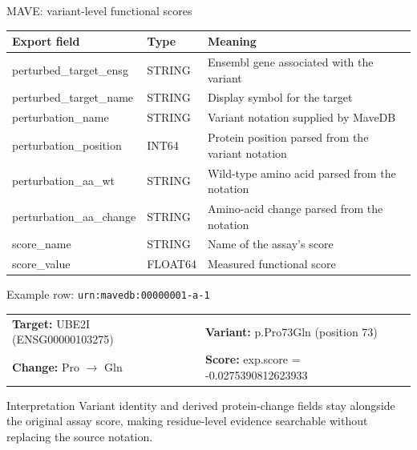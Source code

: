 \documentclass[handout,aspectratio=169]{beamer}
\begin{document}
\begin{frame}{MAVE: variant-level functional scores}
  \small
  \begin{tabularx}{\textwidth}{@{}>{\ttfamily}l l X@{}}
    \toprule
    \textbf{Export field} & \textbf{Type} & \textbf{Meaning} \\
    \midrule
    perturbed\_target\_ensg & STRING & Ensembl gene associated with the variant \\
    perturbed\_target\_name & STRING & Display symbol for the target \\
    perturbation\_name & STRING & Variant notation supplied by MaveDB \\
    perturbation\_position & INT64 & Protein position parsed from the variant notation \\
    perturbation\_aa\_wt & STRING & Wild-type amino acid parsed from the notation \\
    perturbation\_aa\_change & STRING & Amino-acid change parsed from the notation \\
    score\_name & STRING & Name of the assay's score \\
    score\_value & FLOAT64 & Measured functional score \\
    \bottomrule
  \end{tabularx}
  \vfill
  \begin{block}{Example row: \texttt{urn:mavedb:00000001-a-1}}
    \scriptsize
    \begin{tabularx}{\textwidth}{@{}X X@{}}
      \textbf{Target:} UBE2I (ENSG00000103275) & \textbf{Variant:} p.Pro73Gln (position 73) \\
      \textbf{Change:} Pro $\rightarrow$ Gln & \textbf{Score:} exp.score = -0.0275390812623933 \\
    \end{tabularx}
  \end{block}
  \vfill
  \begin{block}{Interpretation}
    Variant identity and derived protein-change fields stay alongside the original assay score, making residue-level evidence searchable without replacing the source notation.
  \end{block}
\end{frame}
\end{document}
